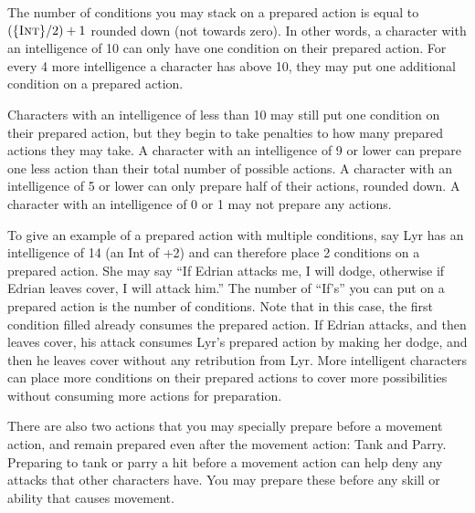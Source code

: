 The number of conditions you may stack on a prepared action is equal to $(\{ \textsc{Int} \}/2) +1$ rounded down (not towards zero). In other words, a character with an intelligence of 10 can only have one condition on their prepared action. For every 4 more intelligence a character has above 10, they may put one additional condition on a prepared action.

Characters with an intelligence of less than 10 may still put one condition on their prepared action, but they begin to take penalties to how many prepared actions they may take. A character with an intelligence of 9 or lower can prepare one less action than their total number of possible actions. A character with an intelligence of 5 or lower can only prepare half of their actions, rounded down. A character with an intelligence of 0 or 1 may not prepare any actions.

To give an example of a prepared action with multiple conditions, say Lyr has an intelligence of 14 (an Int of +2) and can therefore place 2 conditions on a prepared action. She may say ``If Edrian attacks me, I will dodge, otherwise if Edrian leaves cover, I will attack him.'' The number of ``If's'' you can put on a prepared action is the number of conditions. Note that in this case, the first condition filled already consumes the prepared action. If Edrian attacks, and then leaves cover, his attack consumes Lyr’s prepared action by making her dodge, and then he leaves cover without any retribution from Lyr.
More intelligent characters can place more conditions on their prepared actions to cover more possibilities without consuming more actions for preparation.

There are also two actions that you may specially prepare before a movement action, and remain prepared even after the movement action: Tank and Parry. Preparing to tank or parry a hit before a movement action can help deny any attacks that other characters have. You may prepare these before any skill or ability that causes movement.

